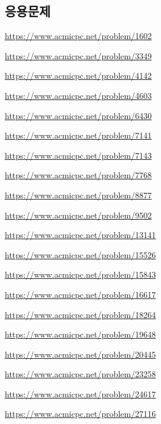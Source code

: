 \subsection{응용문제}
\begin{problem} \url{https://www.acmicpc.net/problem/1602} \end{problem}
\begin{problem} \url{https://www.acmicpc.net/problem/3349} \end{problem}
\begin{problem} \url{https://www.acmicpc.net/problem/4142} \end{problem}
\begin{problem} \url{https://www.acmicpc.net/problem/4603} \end{problem}
\begin{problem} \url{https://www.acmicpc.net/problem/6430} \end{problem}
\begin{problem} \url{https://www.acmicpc.net/problem/7141} \end{problem}
\begin{problem} \url{https://www.acmicpc.net/problem/7143} \end{problem}
\begin{problem} \url{https://www.acmicpc.net/problem/7768} \end{problem}
\begin{problem} \url{https://www.acmicpc.net/problem/8877} \end{problem}
\begin{problem} \url{https://www.acmicpc.net/problem/9502} \end{problem}
\begin{problem} \url{https://www.acmicpc.net/problem/13141} \end{problem}
\begin{problem} \url{https://www.acmicpc.net/problem/15526} \end{problem}
\begin{problem} \url{https://www.acmicpc.net/problem/15843} \end{problem}
\begin{problem} \url{https://www.acmicpc.net/problem/16617} \end{problem}
\begin{problem} \url{https://www.acmicpc.net/problem/18264} \end{problem}
\begin{problem} \url{https://www.acmicpc.net/problem/19648} \end{problem}
\begin{problem} \url{https://www.acmicpc.net/problem/20445} \end{problem}
\begin{problem} \url{https://www.acmicpc.net/problem/23258} \end{problem}
\begin{problem} \url{https://www.acmicpc.net/problem/24617} \end{problem}
\begin{problem} \url{https://www.acmicpc.net/problem/27116} \end{problem}

